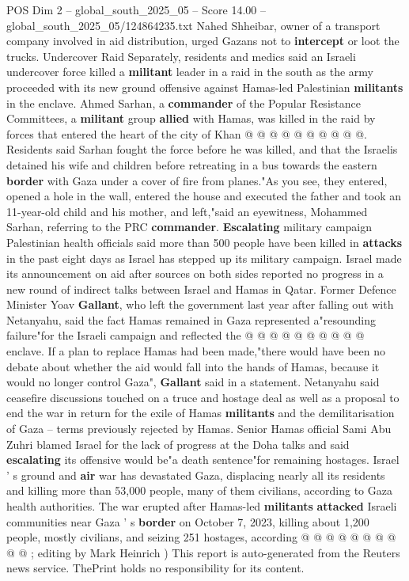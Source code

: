 \begin{textsample}{POS Dim 2 – global\_south\_2025\_05 – Score 14.00 – global\_south\_2025\_05/124864235.txt}
Nahed Shheibar, owner of a transport company involved in aid distribution, urged Gazans not to \textbf{intercept} or loot the trucks.
Undercover Raid Separately, residents and medics said an Israeli undercover force killed a \textbf{militant} leader in a raid in the south as the army proceeded with its new ground offensive against Hamas-led Palestinian \textbf{militants} in the enclave.
Ahmed Sarhan, a \textbf{commander} of the Popular Resistance Committees, a \textbf{militant} group \textbf{allied} with Hamas, was killed in the raid by forces that entered the heart of the city of Khan @ @ @ @ @ @ @ @ @ @.
Residents said Sarhan fought the force before he was killed, and that the Israelis detained his wife and children before retreating in a bus towards the eastern \textbf{border} with Gaza under a cover of fire from planes."As you see, they entered, opened a hole in the wall, entered the house and executed the father and took an 11-year-old child and his mother, and left,"said an eyewitness, Mohammed Sarhan, referring to the PRC \textbf{commander}. \textbf{Escalating} military campaign Palestinian health officials said more than 500 people have been killed in \textbf{attacks} in the past eight days as Israel has stepped up its military campaign.
Israel made its announcement on aid after sources on both sides reported no progress in a new round of indirect talks between Israel and Hamas in Qatar.
Former Defence Minister Yoav \textbf{Gallant}, who left the government last year after falling out with Netanyahu, said the fact Hamas remained in Gaza represented a"resounding failure"for the Israeli campaign and reflected the @ @ @ @ @ @ @ @ @ @ enclave.
If a plan to replace Hamas had been made,"there would have been no debate about whether the aid would fall into the hands of Hamas, because it would no longer control Gaza", \textbf{Gallant} said in a statement.
Netanyahu said ceasefire discussions touched on a truce and hostage deal as well as a proposal to end the war in return for the exile of Hamas \textbf{militants} and the demilitarisation of Gaza -- terms previously rejected by Hamas.
Senior Hamas official Sami Abu Zuhri blamed Israel for the lack of progress at the Doha talks and said \textbf{escalating} its offensive would be"a death sentence"for remaining hostages.
Israel ' s ground and \textbf{air} war has devastated Gaza, displacing nearly all its residents and killing more than 53,000 people, many of them civilians, according to Gaza health authorities.
The war erupted after Hamas-led \textbf{militants} \textbf{attacked} Israeli communities near Gaza ' s \textbf{border} on October 7, 2023, killing about 1,200 people, mostly civilians, and seizing 251 hostages, according @ @ @ @ @ @ @ @ @ @ ; editing by Mark Heinrich ) This report is auto-generated from the Reuters news service.
ThePrint holds no responsibility for its content.

\end{textsample}
